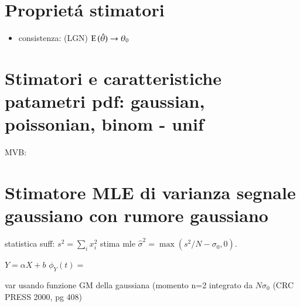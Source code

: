 \section{Propriet\'a stimatori}

\begin{itemize}
\item consistenza: (LGN) $\operatorname{E}{(\hat{\theta})}\to\theta_0$
\end{itemize}

\section{Stimatori e caratteristiche patametri pdf: gaussian, poissonian, binom - unif}

MVB:

\section{Stimatore MLE di varianza segnale gaussiano con rumore gaussiano}

statistica suff: $s^2=\sum_ix_i^2$
stima mle $\hat{\sigma}^2=\max{(s^2/N-\sigma_0,0)}$.

$Y=\alpha X+b$ $\phi_Y(t)=$

var usando funzione GM della gaussiana
(momento n=2 integrato da $N\sigma_0$
(CRC PRESS 2000, pg 408)
